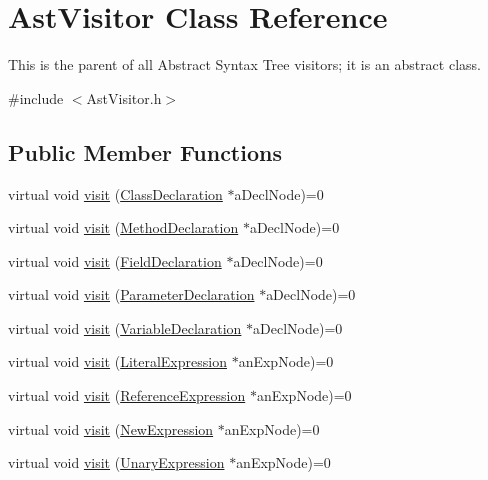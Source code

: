 \hypertarget{classAstVisitor}{
\section{AstVisitor Class Reference}
\label{classAstVisitor}
}


This is the parent of all Abstract Syntax Tree visitors; it is an abstract class.  


{\ttfamily \#include $<$AstVisitor.h$>$}\subsection*{Public Member Functions}
\begin{DoxyCompactItemize}
\item 
virtual void \hyperlink{classAstVisitor_ae922c774d8e8e3fbb9a81a229ef00ecb}{visit} (\hyperlink{classClassDeclaration}{ClassDeclaration} $\ast$aDeclNode)=0
\item 
virtual void \hyperlink{classAstVisitor_ab9d4c10a46ea5252fb90a76f347852af}{visit} (\hyperlink{classMethodDeclaration}{MethodDeclaration} $\ast$aDeclNode)=0
\item 
virtual void \hyperlink{classAstVisitor_a15ca20c155aa1b3c67c983dc9ecf10a7}{visit} (\hyperlink{classFieldDeclaration}{FieldDeclaration} $\ast$aDeclNode)=0
\item 
virtual void \hyperlink{classAstVisitor_a55c262f146345bdeb890ba032e08650a}{visit} (\hyperlink{classParameterDeclaration}{ParameterDeclaration} $\ast$aDeclNode)=0
\item 
virtual void \hyperlink{classAstVisitor_a7b11f0796ae296e3edc720de75a496c3}{visit} (\hyperlink{classVariableDeclaration}{VariableDeclaration} $\ast$aDeclNode)=0
\item 
virtual void \hyperlink{classAstVisitor_a60b3207e90b0a520a30147d4f4fba2a0}{visit} (\hyperlink{classLiteralExpression}{LiteralExpression} $\ast$anExpNode)=0
\item 
virtual void \hyperlink{classAstVisitor_a20dc1c03f85502175abdd5cc7cd25a9d}{visit} (\hyperlink{classReferenceExpression}{ReferenceExpression} $\ast$anExpNode)=0
\item 
virtual void \hyperlink{classAstVisitor_a84ce449d7f5ede3881cdcb8ac8f94078}{visit} (\hyperlink{classNewExpression}{NewExpression} $\ast$anExpNode)=0
\item 
virtual void \hyperlink{classAstVisitor_ab1c2fc3a9145d871b7f8a502324b58a7}{visit} (\hyperlink{classUnaryExpression}{UnaryExpression} $\ast$anExpNode)=0
\item 

\end{DoxyCompactItemize}
